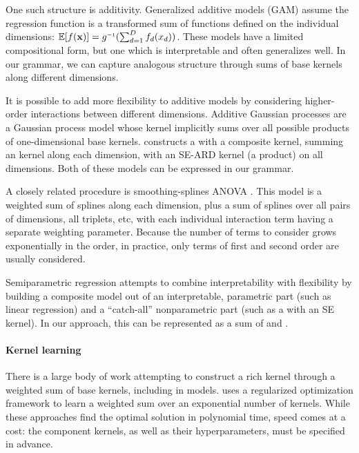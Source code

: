 \documentclass[twoside]{article}
\begin{document}
One such structure is additivity.
Generalized additive models (GAM) assume the regression function is a transformed sum of functions defined on the individual dimensions: $\expect[f(\vx)] = g\inv(\sum_{d=1}^D f_d(x_d))$.
These models have a limited compositional form, but one which is interpretable and often generalizes well.
In our grammar, we can capture analogous structure through sums of base kernels along different dimensions.

It is possible to add more flexibility to additive models by considering higher-order interactions between different dimensions. 
Additive Gaussian processes \cite{duvenaud2011additive11} are a Gaussian process model whose kernel implicitly sums over all possible products of one-dimensional base kernels.  
\cite{plate1999accuracy} constructs a \gp{} with a composite kernel, summing an \kSE{} kernel along each dimension, with an SE-ARD kernel (\ie a product) on all dimensions.
Both of these models can be expressed in our grammar.

A closely related procedure is smoothing-splines ANOVA \cite{wahba1990spline, gu2002smoothing}.
This model is a weighted sum of splines along each dimension, plus a sum of splines over all pairs of dimensions, all triplets, etc, with each individual interaction term having a separate weighting parameter.
Because the number of terms to consider grows exponentially in the order, in practice, only terms of first and second order are usually considered.

Semiparametric regression \citep[e.g.][]{ruppert2003semiparametric} attempts to combine interpretability with flexibility by building  a composite model out of an interpretable, parametric part (such as linear regression) and a ``catch-all'' nonparametric part (such as a \gp{} with an SE kernel).
In our approach, this can be represented as a sum of \kSE{} and \kLin{}.

\paragraph{Kernel learning}
There is a large body of work attempting to construct a rich kernel through a weighted sum of base kernels, including in \gp{} models.  
\cite{christoudias2009bayesian}
\cite{Bach_HKL} uses a regularized optimization framework to learn a weighted sum over an exponential number of kernels.
While these approaches find the optimal solution in polynomial time, speed comes at a cost: the component kernels, as well as their hyperparameters, must be specified in advance.
\end{document}
